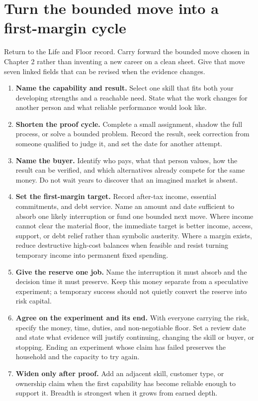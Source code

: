 \enlargethispage{3\baselineskip}
\section{Turn the bounded move into a first-margin cycle}

Return to the Life and Floor record. Carry forward the bounded move chosen in
Chapter 2 rather than inventing a new career on a clean sheet. Give that move
seven linked fields that can be revised when the evidence changes.

\begin{enumerate}[itemsep=0.1em,topsep=0.35em,parsep=0pt]
\item \textbf{Name the capability and result.} Select one skill that fits both
  your developing strengths and a reachable need. State what the work changes
  for another person and what reliable performance would look like.

\item \textbf{Shorten the proof cycle.} Complete a small assignment, shadow the
  full process, or solve a bounded problem. Record the result, seek correction
  from someone qualified to judge it, and set the date for another attempt.

\item \textbf{Name the buyer.} Identify who pays, what that person values, how
  the result can be verified, and which alternatives already compete for the
  same money. Do not wait years to discover that an imagined market is absent.

\item \textbf{Set the first-margin target.} Record after-tax income, essential
  commitments, and debt service. Name an amount and date sufficient to absorb
  one likely interruption or fund one bounded next move. Where income cannot
  clear the material floor, the immediate target is better income, access,
  support, or debt relief rather than symbolic austerity. Where a margin exists,
  reduce destructive high-cost balances when feasible and resist turning
  temporary income into permanent fixed spending.

\item \textbf{Give the reserve one job.} Name the interruption it must absorb
  and the decision time it must preserve. Keep this money separate from a
  speculative experiment; a temporary success should not quietly convert the
  reserve into risk capital.

\item \textbf{Agree on the experiment and its end.} With everyone carrying the
  risk, specify the money, time, duties, and non-negotiable floor. Set a review
  date and state what evidence will justify continuing, changing the skill or
  buyer, or stopping. Ending an experiment whose claim has failed preserves
  the household and the capacity to try again.

\item \textbf{Widen only after proof.} Add an adjacent skill, customer type, or
  ownership claim when the first capability has become reliable enough to
  support it. Breadth is strongest when it grows from earned depth.
\end{enumerate}

